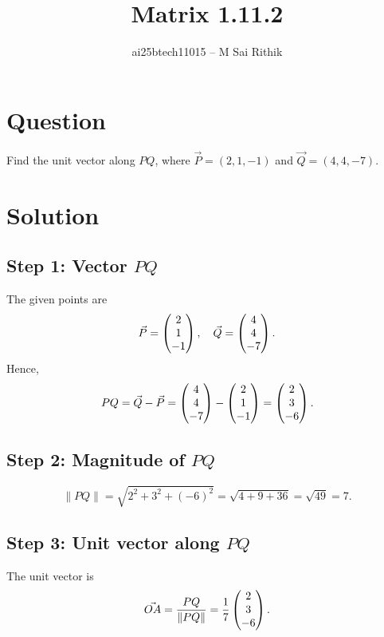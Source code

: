 \documentclass[12pt]{article}
\title{Matrix 1.11.2}
\author{ai25btech11015 -- M Sai Rithik}
\date{}
\begin{document}
\maketitle

\section*{Question}
Find the unit vector along $PQ$, where $\Vec{P}=(2,1,-1)$ and $\Vec{Q}=(4,4,-7)$.  


\section*{Solution}

\subsection*{Step 1: Vector $PQ$}
The given points are
\[
\Vec{P} = \begin{pmatrix}2 \\ 1 \\ -1\end{pmatrix}, 
\quad \Vec{Q} = \begin{pmatrix}4 \\ 4 \\ -7\end{pmatrix}.
\]
Hence,
\begin{equation}
PQ = \Vec{Q} - \Vec{P} = \begin{pmatrix}4 \\ 4 \\ -7\end{pmatrix} - \begin{pmatrix}2 \\ 1 \\ -1\end{pmatrix}
= \begin{pmatrix}2 \\ 3 \\ -6\end{pmatrix}.
\end{equation}

\subsection*{Step 2: Magnitude of $PQ$}
\begin{equation}
\|PQ\| = \sqrt{2^2 + 3^2 + (-6)^2}
= \sqrt{4+9+36}
= \sqrt{49} = 7.
\end{equation}

\subsection*{Step 3: Unit vector along $PQ$}
The unit vector is
\begin{equation}
\Vec{OA} = \frac{PQ}{\|PQ\|}
= \frac{1}{7}\begin{pmatrix}2 \\ 3 \\ -6\end{pmatrix}.
\end{equation}
\end{document}
